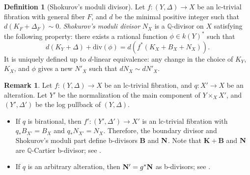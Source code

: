 \documentclass{amsart}
\theoremstyle{definition}
\newtheorem{remark}[theorem]{Remark}
\newtheorem{defn}[theorem]{Definition}
\theoremstyle{remark}
\def\bQ{\mathbb{Q}}
\newcommand\bfN{{\bf N}}
\numberwithin{equation}{section}
\begin{document}
 \begin{defn}[Shokurov's moduli divisor]\label{defn:Shokurovmoduli}
Let $f \colon (Y, \Delta) \to X$ be an lc-trivial fibration with general fiber $F$, and $d$ be the minimal positive integer such that $d(K_{F}+ \Delta_F)\sim 0$.
\emph{Shokurov's moduli divisor} $N_X$ is a $\bQ$-divisor on $X$ 
satisfying
the following property: there exists a rational function $\phi \in k(Y)^*$
such that
\[d(K_{Y}+ \Delta) + \mathrm{div}(\phi) = d(f^*(K_X +B_X + N_{X})).\] 
It is uniquely defined up to $d$-linear equivalence: any change in the choice of $K_Y$, $K_X$, and $\phi$ gives a new $N'_{X}$ 
such that $dN_X \sim dN'_X$.
\end{defn}

\begin{remark}\label{rmk:bdivisor}
    Let $f \colon (Y, \Delta) \to X$ be an lc-trivial fibration, and $q \colon X' \to X$ be an alteration. Let $Y'$ be the normalization of the main component of $Y \times_{X} X'$, and $(Y', \Delta')$ be the log pullback of $(Y, \Delta)$.
    \begin{itemize}
    \item If $q$ is birational, then $f' \colon (Y', \Delta') \to X'$ is an lc-trivial fibration with $q_* B_{X'}=B_{X}$ and $q_* N_{X'} = N_{X}$. Therefore, the boundary divisor and Shokurov's moduli part define b-divisors $\mathbf{B}$ and $\bfN$. Note that $\mathbf{K} + \mathbf{B}$ and $\bfN$ are $\bQ$-Cartier b-divisor; see \cite[Thm.~2.7]{Amb04}.
    \item If $q$ is an arbitrary alteration, then $\bfN' = g^*\bfN$ as b-divisors;
    see \cite[Prop.~5.5]{Amb04}.
    \end{itemize}
\end{remark}
\end{document}
